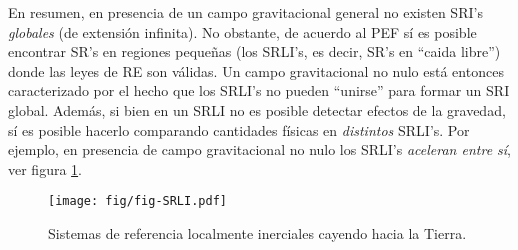 En resumen, en presencia de un campo gravitacional general no existen SRI's \emph{globales} (de extensión infinita). No obstante, de acuerdo al PEF sí es posible encontrar SR's en regiones peque\~nas (los SRLI's, es decir, SR's en ``caida libre'') donde las leyes de RE son válidas. Un campo gravitacional no nulo está entonces caracterizado por el hecho que los SRLI's no pueden ``unirse'' para formar un SRI global. Además, si bien en un SRLI no es posible detectar efectos de la gravedad, sí es posible hacerlo comparando cantidades físicas en \textit{distintos} SRLI's. Por ejemplo, en presencia de campo gravitacional no nulo los SRLI's \textit{aceleran entre sí}, ver figura \ref{fig:SRLI}.
\begin{figure}[H]
\centering\texttt{[image: fig/fig-SRLI.pdf]}
\caption{Sistemas de referencia localmente inerciales cayendo hacia la Tierra.}
\label{fig:SRLI}
\end{figure}

